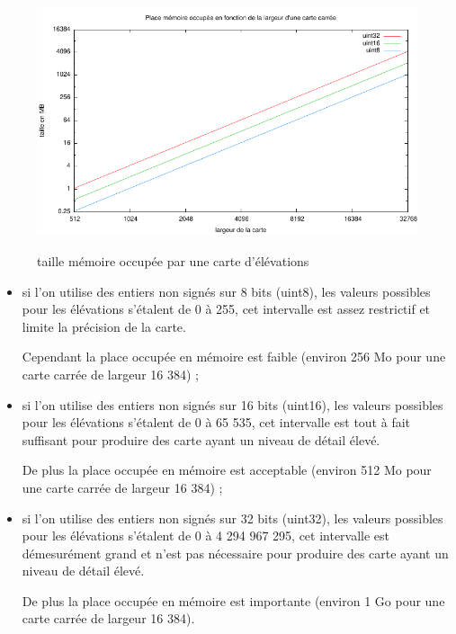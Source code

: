 \begin{figure}[!ht]
    \begin{center}
        \includegraphics[width=15cm]{resources/heightmap-memory.pdf}
        \label{fig:heightmap_memory}
        \caption{taille mémoire occupée par une carte d'élévations}
    \end{center}
\end{figure}

\begin{itemize}
\item si l'on utilise des entiers non signés sur 8 bits (uint8), les valeurs
possibles pour les élévations s'étalent de 0 à 255, cet intervalle est assez
restrictif et limite la précision de la carte.

Cependant la place occupée en mémoire est faible (environ 256 Mo pour une carte
carrée de largeur 16 384) ;\\

\item si l'on utilise des entiers non signés sur 16 bits (uint16), les valeurs
possibles pour les élévations s'étalent de 0 à 65 535, cet intervalle est tout à
fait suffisant pour produire des carte ayant un niveau de détail élevé.

De plus la place occupée en mémoire est acceptable (environ 512 Mo pour une carte
carrée de largeur 16 384) ;\\

\item si l'on utilise des entiers non signés sur 32 bits (uint32), les valeurs
possibles pour les élévations s'étalent de 0 à 4 294 967 295, cet intervalle est
démesurément grand et n'est pas nécessaire pour produire des carte ayant un
niveau de détail élevé.

De plus la place occupée en mémoire est importante (environ 1 Go pour une carte
carrée de largeur 16 384).
\end{itemize}